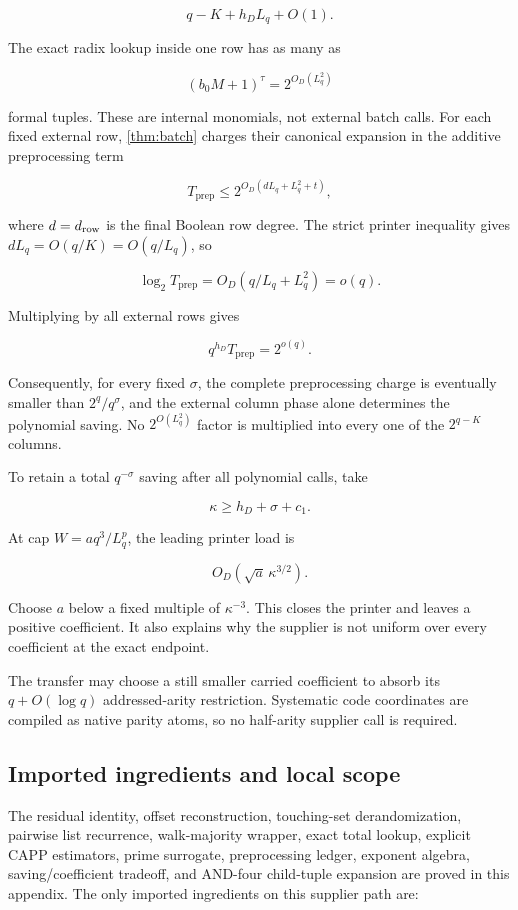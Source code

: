 \documentclass[11pt,letterpaper]{article}
\newcommand{\cref}[1]{\ref{#1}}
\theoremstyle{definition}
\theoremstyle{remark}
\begin{document}
\[
q-K+h_D L_q+O(1).
\]

The exact radix lookup inside one row has as many as

\[
(b_0M+1)^{\tau}
{}={}
2^{O_D(L_q^2)}
\]

formal tuples. These are internal monomials, not external batch calls.
For each fixed external row, \cref{thm:batch} charges their canonical
expansion in the additive preprocessing term

\[
T_{\mathrm{prep}}
\le
2^{O_D(dL_q+L_q^2+t)},
\]

where \(d=d_{\rm row}\) is the final Boolean row degree. The strict
printer inequality gives \(dL_q=O(q/K)=O(q/L_q)\), so

\[
\log_2T_{\mathrm{prep}}
{}={}
O_D(q/L_q+L_q^2)
=o(q).
\]

Multiplying by all external rows gives

\[
q^{h_D}T_{\mathrm{prep}}
{}={}
2^{o(q)}.
\]

Consequently, for every fixed \(\sigma\), the complete preprocessing
charge is eventually smaller than \(2^q/q^\sigma\), and the external
column phase alone determines the polynomial saving. No \(2^{O(L_q^2)}\)
factor is multiplied into every one of the \(2^{q-K}\) columns.

To retain a total \(q^{-\sigma}\) saving after all polynomial calls,
take

\[
\kappa\ge h_D+\sigma+c_1.
\]

At cap \(W=a q^3/L_q^p\), the leading printer load is

\[
O_D(\sqrt a\,\kappa^{3/2}).
\]

Choose \(a\) below a fixed multiple of \(\kappa^{-3}\). This closes the
printer and leaves a positive coefficient. It also explains why the
supplier is not uniform over every coefficient at the exact endpoint.

The transfer may choose a still smaller carried coefficient to absorb
its \(q+O(\log q)\) addressed-arity restriction. Systematic code
coordinates are compiled as native parity atoms, so no half-arity
supplier call is required.

\subsection{Imported ingredients and local
scope}\label{a9-imported-ingredients-and-local-scope}

The residual identity, offset reconstruction, touching-set
derandomization, pairwise list recurrence, walk-majority wrapper, exact
total lookup, explicit CAPP estimators, prime surrogate, preprocessing
ledger, exponent algebra, saving/coefficient tradeoff, and AND-four
child-tuple expansion are proved in this appendix. The only imported
ingredients on this supplier path are:
\end{document}
